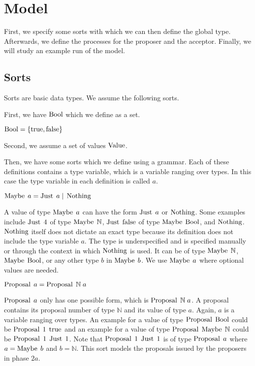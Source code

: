 \chapter{Model}
First, we specify some sorts with which we can then define the global type.
Afterwards, we define the processes for the proposer and the acceptor.
Finally, we will study an example run of the model.

\section{Sorts}
Sorts are basic data types.
We assume the following sorts.

First, we have $\operatorname{Bool}$ which we define as a set.

$\operatorname{Bool} = \left\{\operatorname{true}, \operatorname{false}\right\}$

Second, we assume a set of values $\operatorname{Value}$.

Then, we have some sorts which we define using a grammar.
Each of these definitions contains a type variable, which is a variable ranging over types.
In this case the type variable in each definition is called $a$.

$\operatorname{Maybe}\; a = \operatorname{Just}\; a \; | \; \operatorname{Nothing}$

A value of type $\operatorname{Maybe}\; a$ can have the form $\operatorname{Just}\; a$ or $\operatorname{Nothing}$.
Some examples include $\operatorname{Just}\; 4$ of type $\operatorname{Maybe}\; \mathbb{N}$, $\operatorname{Just}\; \operatorname{false}$ of type $\operatorname{Maybe}\; \operatorname{Bool}$, and $\operatorname{Nothing}$.
$\operatorname{Nothing}$ itself does not dictate an exact type because its definition does not include the type variable $a$.
The type is underspecified and is specified manually or through the context in which $\operatorname{Nothing}$ is used.
It can be of type $\operatorname{Maybe}\; \mathbb{N}$, $\operatorname{Maybe}\; \operatorname{Bool}$, or any other type $b$ in $\operatorname{Maybe}\; b$.
We use $\operatorname{Maybe}\; a$ where optional values are needed.

$\operatorname{Proposal}\; a = \operatorname{Proposal}\; \mathbb{N}\; a$

$\operatorname{Proposal}\; a$ only has one possible form, which is $\operatorname{Proposal}\; \mathbb{N}\; a$.
A proposal contains its proposal number of type $\mathbb{N}$ and its value of type $a$.
Again, $a$ is a variable ranging over types.
An example for a value of type $\operatorname{Proposal}\; \operatorname{Bool}$ could be $\operatorname{Proposal}\; 1\; \operatorname{true}$ and an example for a value of type $\operatorname{Proposal}\; \operatorname{Maybe}\; \mathbb{N}$ could be $\operatorname{Proposal}\; 1\; \operatorname{Just}\; 1$.
Note that $\operatorname{Proposal}\; 1\; \operatorname{Just}\; 1$ is of type $\operatorname{Proposal}\; a$ where $a = \operatorname{Maybe}\; b$ and $b = \mathbb{N}$.
This sort models the proposals issued by the proposers in phase $2a$.

